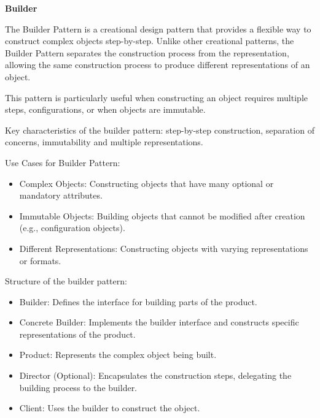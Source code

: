 \medskip
\begin{center}
\textbf{Builder}
\end{center}

The Builder Pattern is a creational design pattern that provides a flexible way to construct complex objects step-by-step. Unlike other creational patterns, the Builder Pattern separates the construction process from the representation, allowing the same construction process to produce different representations of an object.

This pattern is particularly useful when constructing an object requires multiple steps, configurations, or when objects are immutable.

Key characteristics of the builder pattern: step-by-step construction, separation of concerns, immutability and multiple representations.

Use Cases for Builder Pattern:

\begin{itemize}
\item Complex Objects: Constructing objects that have many optional or mandatory attributes.

\item Immutable Objects: Building objects that cannot be modified after creation (e.g., configuration objects).

\item Different Representations: Constructing objects with varying representations or formats.
\end{itemize}

Structure of the builder pattern:

\begin{itemize}
\item Builder: Defines the interface for building parts of the product.

\item Concrete Builder: Implements the builder interface and constructs specific representations of the product.

\item Product: Represents the complex object being built.

\item Director (Optional): Encapsulates the construction steps, delegating the building process to the builder.

\item Client: Uses the builder to construct the object.
\end{itemize}

